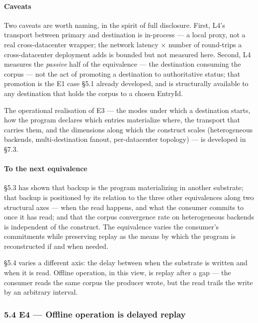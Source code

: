 \documentclass[
]{article}
\begin{document}
\paragraph{Caveats}\label{caveats}

Two caveats are worth naming, in the spirit of full disclosure. First,
L4's transport between primary and destination is in-process --- a local
proxy, not a real cross-datacenter wrapper; the network latency × number
of round-trips a cross-datacenter deployment adds is bounded but not
measured here. Second, L4 measures the \emph{passive} half of the
equivalence --- the destination consuming the corpus --- not the act of
promoting a destination to authoritative status; that promotion is the
E1 case §5.1 already developed, and is structurally available to any
destination that holds the corpus to a chosen EntryId.

The operational realisation of E3 --- the modes under which a
destination starts, how the program declares which entries materialize
where, the transport that carries them, and the dimensions along which
the construct scales (heterogeneous backends, multi-destination fanout,
per-datacenter topology) --- is developed in §7.3.

\paragraph{To the next equivalence}\label{to-the-next-equivalence-1}

§5.3 has shown that backup is the program materializing in another
substrate; that backup is positioned by its relation to the three other
equivalences along two structural axes --- when the read happens, and
what the consumer commits to once it has read; and that the corpus
convergence rate on heterogeneous backends is independent of the
construct. The equivalence varies the consumer's commitments while
preserving replay as the means by which the program is reconstructed if
and when needed.

§5.4 varies a different axis: the delay between when the substrate is
written and when it is read. Offline operation, in this view, is replay
after a gap --- the consumer reads the same corpus the producer wrote,
but the read trails the write by an arbitrary interval.

\subsubsection{5.4 E4 --- Offline operation is delayed
replay}\label{e4-offline-operation-is-delayed-replay}
\end{document}
